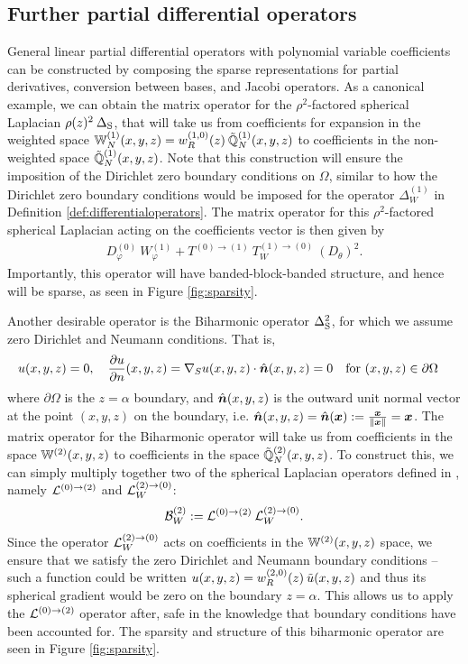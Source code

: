 \documentclass[11pt, oneside]{article}   	%
\begin{document}
\subsection{Further partial differential operators}\label{subsection:furtherdiffoperators}
General linear partial differential operators with polynomial variable coefficients can be constructed by composing the sparse representations for partial derivatives, conversion between bases, and Jacobi operators. As a canonical example, we can obtain the matrix operator for the $\rho^2$-factored spherical Laplacian $\rho(z)^2 \: \DeltaS$, that will take us from coefficients for expansion in the weighted space $\bigW_N^{(1)}(x,y,z) = \genjacw^{(1,0)}(z) \: \bigscopN^{(1)}(x,y,z)$ to coefficients in the non-weighted space $\bigscopN^{(1)}(x,y,z)$. Note that this construction will ensure the imposition of the Dirichlet zero boundary conditions on $\Omega$, similar to how the Dirichlet zero boundary conditions would be imposed for the operator $\Delta^{(1)}_W$ in Definition \ref{def:differentialoperators}. The matrix operator for this $\rho^2$-factored spherical Laplacian acting on the coefficients vector is then given by
\begin{align*}
	D_\varphi^{(0)} \: W_\varphi^{(1)} + T^{(0)\to(1)} \: T_W^{(1)\to(0)} \: (D_\theta)^2.
\end{align*}
Importantly, this operator will have banded-block-banded structure, and hence will be sparse, as seen in Figure \ref{fig:sparsity}.

Another desirable operator is the Biharmonic operator $\DeltaS^2$, for which we assume zero Dirichlet and Neumann conditions. That is, 
\begin{align*}
	u(x,y,z) &= 0, \quad \pfpx{n}{u}(x,y,z) = \nabla_S u(x,y,z) \cdot \unitvec{n}(x,y,z) = 0 \quad \text{for } (x,y,z) \in \partial\Omega
\end{align*}
where $\partial\Omega$ is the $z=\alpha$ boundary, and $\unitvec{n}(x,y,z)$ is the outward unit normal vector at the point $(x,y,z)$ on the boundary, i.e. $\unitvec{n}(x,y,z) = \unitvec{n}(\vec x) := {\vec x \over \norm{\vec x}} = \vec x$. The matrix operator for the Biharmonic operator will take us from coefficients in the space $\bigW^{(2)}(x,y,z)$ to coefficients in the space $\bigscopN^{(2)}(x,y,z)$. To construct this, we can simply multiply together two of the spherical Laplacian operators defined in , namely $\calL^{(0)\to(2)}$ and $\calL_W^{(2)\to(0)}$:
\begin{align*}
	\calB^{(2)}_W := \calL^{(0)\to(2)} \: \calL_W^{(2)\to(0)}.
\end{align*}
Since the operator $\calL_W^{(2)\to(0)}$ acts on coefficients in the $\bigW^{(2)}(x,y,z)$ space, we ensure that we satisfy the zero Dirichlet and Neumann boundary conditions -- such a function could be written $u(x,y,z) = \genjacw^{(2,0)}(z) \: \tilde u(x,y,z)$ and thus its spherical gradient would be zero on the boundary $z = \alpha$. This allows us to apply the $\calL^{(0)\to(2)}$ operator after, safe in the knowledge that boundary conditions have been accounted for. The sparsity and structure of this biharmonic operator are seen in Figure \ref{fig:sparsity}.
\end{document}
